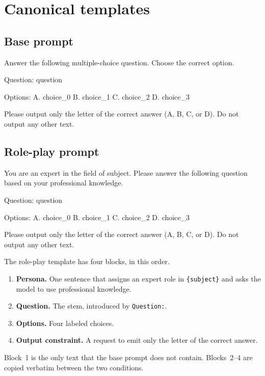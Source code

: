 \documentclass[11pt]{article}
\newcommand{\slot}[1]{\texttt{\{#1\}}}
\begin{document}
\section{Canonical templates}
\label{sec:templates}

\subsection{Base prompt}
\begin{Prompt}
Answer the following multiple-choice question. Choose the correct option.

Question: {question}

Options:
A. {choice_0}
B. {choice_1}
C. {choice_2}
D. {choice_3}

Please output only the letter of the correct answer (A, B, C, or D). Do not output any other text.
\end{Prompt}

\subsection{Role-play prompt}
\begin{Prompt}
You are an expert in the field of {subject}. Please answer the following question based on your professional knowledge.

Question: {question}

Options:
A. {choice_0}
B. {choice_1}
C. {choice_2}
D. {choice_3}

Please output only the letter of the correct answer (A, B, C, or D). Do not output any other text.
\end{Prompt}

The role-play template has four blocks, in this order.
\begin{enumerate}[leftmargin=1.4em]
  \item \textbf{Persona.} One sentence that assigns an expert role in \slot{subject} and asks the model to use professional knowledge.
  \item \textbf{Question.} The stem, introduced by \texttt{Question:}.
  \item \textbf{Options.} Four labeled choices.
  \item \textbf{Output constraint.} A request to emit only the letter of the correct answer.
\end{enumerate}
Block~1 is the only text that the base prompt does not contain.
Blocks~2--4 are copied verbatim between the two conditions.
\end{document}
